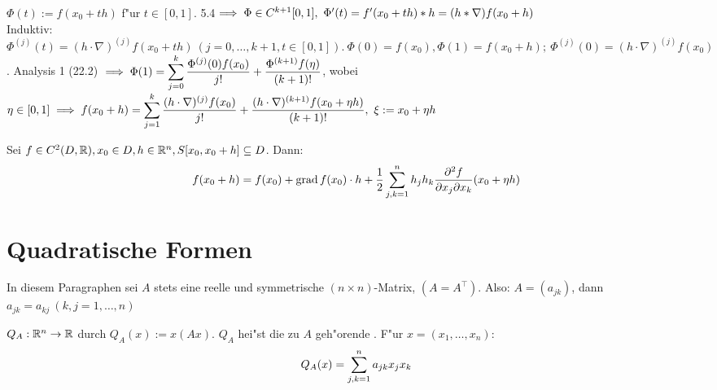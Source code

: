 \documentclass[a4paper,twoside,DIV15,BCOR12mm]{scrbook}
\begin{document}
\begin{beweis}
$\Phi(t):=f(x_0+th)$ f"ur $t\in[0,1]$. 5.4$\folgt \Phi \in C^{k+1}[0,1],\ \Phi'(t)=f'(x_0+th)*h=(h*\nabla)f(x_0+h)$\\
Induktiv: $\Phi^{(j)}(t)=(h\cdot\nabla)^{(j)}f(x_0+th)\ (j=0,\ldots,k+1, t\in[0,1]).\ \Phi(0)=f(x_0), \Phi(1)=f(x_0+h);\ \Phi^{(j)}(0)=(h\cdot\nabla)^{(j)}f(x_0)$. Analysis 1 (22.2) $\implies \Phi(1)=\displaystyle\sum_{j=0}^k\frac{\Phi^{(j)}(0)f(x_0)}{j!}+\frac{\Phi^{(k+1)}f(\eta)}{(k+1)!}$, wobei $\eta\in[0,1]\implies f(x_0+h)=\displaystyle\sum_{j=1}^k\frac{(h\cdot\nabla)^{(j)}f(x_0)}{j!}+\frac{(h\cdot\nabla)^{(k+1)}f(x_0+\eta h)}{(k+1)!},\ \xi:=x_0+\eta h$
\end{beweis}

\begin{spezialfall}
Sei $f\in C^2(D,\mathbb{R}),x_0\in D, h\in \mathbb{R}^n, S[x_0,x_0+h]\subseteq D$. Dann: 
$$f(x_0+h)=f(x_0)+\grad f(x_0)\cdot h+\frac{1}{2}\sum_{j,k=1}^nh_jh_k\frac{\partial^2 f}{\partial x_j\partial x_k}(x_0+\eta h)$$
\end{spezialfall}

\chapter{Quadratische Formen}
\def\grad{\mathop{\rm grad}\nolimits}

\begin{vereinbarung}
In diesem Paragraphen sei $A$ stets eine reelle und symmetrische $(n\times n)$-Matrix, $(A=A^\top)$. Also: $A=(a_{jk})$, dann $a_{jk}=a_{kj}\ (k,j=1,\ldots,n)$ 
\end{vereinbarung}

\begin{definition*}
$Q_A:\mathbb{R}^n\to\mathbb{R}$ durch $Q_A(x):=x(Ax)$. $Q_A$ hei"st die zu $A$ geh"orende . F"ur $x=(x_1,\ldots,x_n):$
$$Q_A(x)=\displaystyle\sum_{j,k=1}^na_{jk}x_jx_k$$
\end{definition*}
\end{document}
